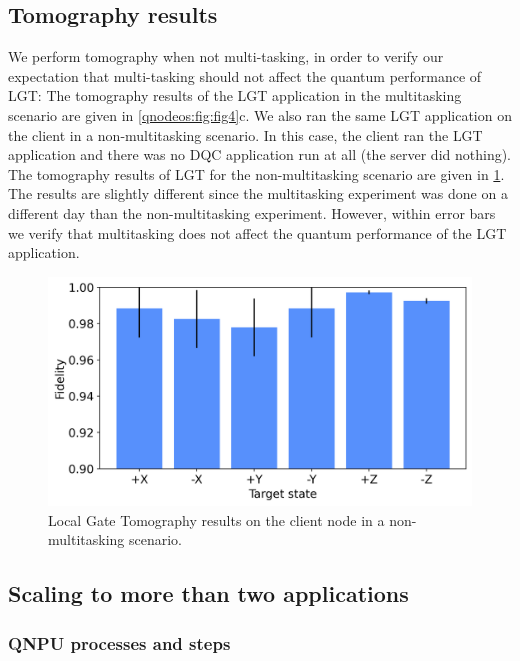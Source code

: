\subsection{Tomography results}
\label{qnodeos:sec:multitasking-tomography}

We perform tomography when not multi-tasking, in order to verify our expectation that multi-tasking should not affect the quantum performance of \ac{LGT}: The tomography results of the \ac{LGT} application in the multitasking scenario are given in \cref{qnodeos:fig:fig4}c. We also ran the same \ac{LGT} application on the client in a non-multitasking scenario. In this case, the client ran the \ac{LGT} application and there was no \ac{DQC} application run at all (the server did nothing). The tomography results of \ac{LGT} for the non-multitasking scenario are given in \cref{qnodeos:fig:tomography-no-multitasking}. The results are slightly different since the multitasking experiment was done on a different day than the non-multitasking experiment. However, within error bars we verify that multitasking does not affect the quantum performance of the \ac{LGT} application.

\begin{figure}
\centering
\includegraphics[width=\linewidth]{figures/qnodeos/supplementary/plots/noMT_gate_tomography.png}
\caption{Local Gate Tomography results on the client node in a non-multitasking scenario.}
\label{qnodeos:fig:tomography-no-multitasking}
\end{figure}

\subsection{Scaling to more than two applications}
\label{qnodeos:sec:multitasking-scaling}

\subsubsection{QNPU processes and steps}

